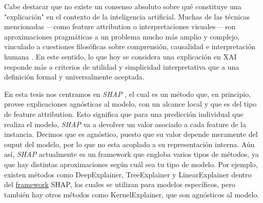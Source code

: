 \begin{itemize}
    Cabe destacar que no existe un consenso absoluto sobre qué constituye una "explicación" en el contexto de la inteligencia artificial. Muchas de las técnicas mencionadas —como feature attribution o interpretaciones visuales— son aproximaciones pragmáticas a un problema mucho más amplio y complejo, vinculado a cuestiones filosóficas sobre comprensión, causalidad e interpretación humana \cite{MILLER20191, lipton2017mythosmodelinterpretability}. En este sentido, lo que hoy se considera una explicación en XAI responde más a criterios de utilidad y simplicidad interpretativa que a una definición formal y universalmente aceptada.

\end{itemize}

En esta tesis nos centramos en \textit{SHAP} \cite{shapOriginalPaper}, el cual es un método que, en principio, provee explicaciones agnósticas al modelo, con un alcance local y que es del tipo de feature attribution. Esto significa que para una predicción individual que realiza el modelo, \textit{SHAP} va a devolver un valor asociado a cada feature de la instancia. Decimos que es agnóstico, puesto que su valor depende meramente del ouput del modelo, por lo que no esta acoplado a su representación interna. Aún así, \textit{SHAP} actualmente es un framework que engloba varios tipos de métodos, ya que hay distintas aproximaciones según cuál sea tu tipo de modelo. Por ejemplo, existen métodos como DeepExplainer, TreeExplainer y LinearExplainer dentro del  \textcolor{blue}{\href{https://shap.readthedocs.io/en/latest/index.html}{framework}}  SHAP, los cuales se utilizan para modelos específicos, pero también hay otros métodos como KernelExplainer, que son agnósticos al modelo.


